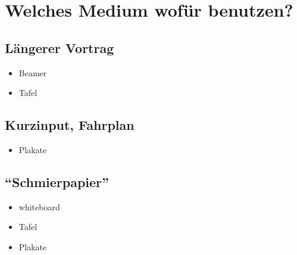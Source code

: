 \section{Welches Medium wofür benutzen?}
\label{medien}

\subsection{Längerer Vortrag}
\begin{itemize}
  \item Beamer
  \item Tafel
\end{itemize}

\subsection{Kurzinput, Fahrplan}
\begin{itemize}
  \item Plakate
\end{itemize}

\subsection{"`Schmierpapier"'}
\begin{itemize}
  \item whiteboard
  \item Tafel
  \item Plakate
\end{itemize}
